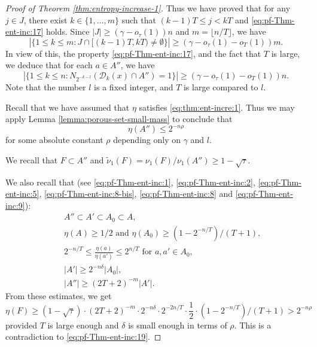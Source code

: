 \documentclass[a4paper,11pt]{amsart}
\theoremstyle{definition}
\numberwithin{equation}{section}
\def\D{\mathcal{D}}
\begin{document}
\begin{proof}[Proof of Theorem \ref{thm:entropy-increase-1}]
{{Thus we have proved that for  any $j\in J$, there exist $k\in \{1,\ldots, m\}$ such that $(k-1)T\le j<kT$ and \eqref{eq:pf-Thm-ent-inc:17} holds.  Since $|J|\ge (\gamma-o_\tau(1))n$ and $m=\lfloor n/T\rfloor$, we have
\[
|\{ 1\le k\le m: J\cap  [(k-1)T,kT)\neq \emptyset \}| \ge (\gamma-o_\tau(1)-o_T(1))m.
\]
In view of this,  the property \eqref{eq:pf-Thm-ent-inc:17},  and the fact that $T$ is large,  we deduce that for each $a\in A''$, we have
\begin{equation}\label{eq:pf-Thm-ent-inc:18...}
\left| \{ 1\le k\le n: N_{2^{-k-l}}(\D_k(x)\cap A'')=1 \} \right| \ge  (\gamma-o_\tau(1)-o_T(1))n.
\end{equation}
Note that the number $l$ is a fixed integer,  and $T$ is large compared to $l$.


Recall that we have assumed that $\eta$ satisfies \eqref{eq:thm:ent-incre:1}.  Thus we may apply Lemma \ref{lemma:porous-set-small-mass} to conclude that 
\begin{equation}\label{eq:pf-Thm-ent-inc:19...}
\eta(A'')\le 2^{-n\rho}
\end{equation}
for some absolute constant $\rho$ depending only on $\gamma$ and $l$.  
}
\fi

We recall that $F\subset A''$ and $\tilde{\nu}_1(F)=\nu_1(F)/\nu_1(A'')\ge 1-\sqrt{\tau}$.  }
We also recall that (see \eqref{eq:pf-Thm-ent-inc:1}, \eqref{eq:pf-Thm-ent-inc:2}, \eqref{eq:pf-Thm-ent-inc:5},  \eqref{eq:pf-Thm-ent-inc:8-bis}, \eqref{eq:pf-Thm-ent-inc:8} and \eqref{eq:pf-Thm-ent-inc:9}):
\begin{eqnarray*}
 & & A''\subset A'\subset A_0\subset A,  \\
& & \eta(A)\ge 1/2 \textrm{ and } \eta(A_0)\ge (1-2^{-n/T})/(T+1), \\
& & 2^{-n/T}\le \frac{\eta(a)}{\eta(a')}\le 2^{n/T} \textrm{ for } a,a'\in A_0,\\
& & |A'|\ge 2^{-n\delta}|A_0|, \\
& & |A''| \ge (2T+2)^{-m}|A'|. 
\end{eqnarray*}
From these estimates, we get 
\[
\eta(F)\ge (1-\sqrt{\tau})\cdot(2T+2)^{-m}\cdot 2^{-n\delta} \cdot 2^{-2n/T}  \cdot \frac{1}{2}  \cdot (1-2^{-n/T})/(T+1) >2^{-n\rho}
\]
 provided $T$ is large enough and $\delta$ is small enough in terms of $\rho$. This is a contradiction to \eqref{eq:pf-Thm-ent-inc:19}.
\end{proof}
\end{document}
